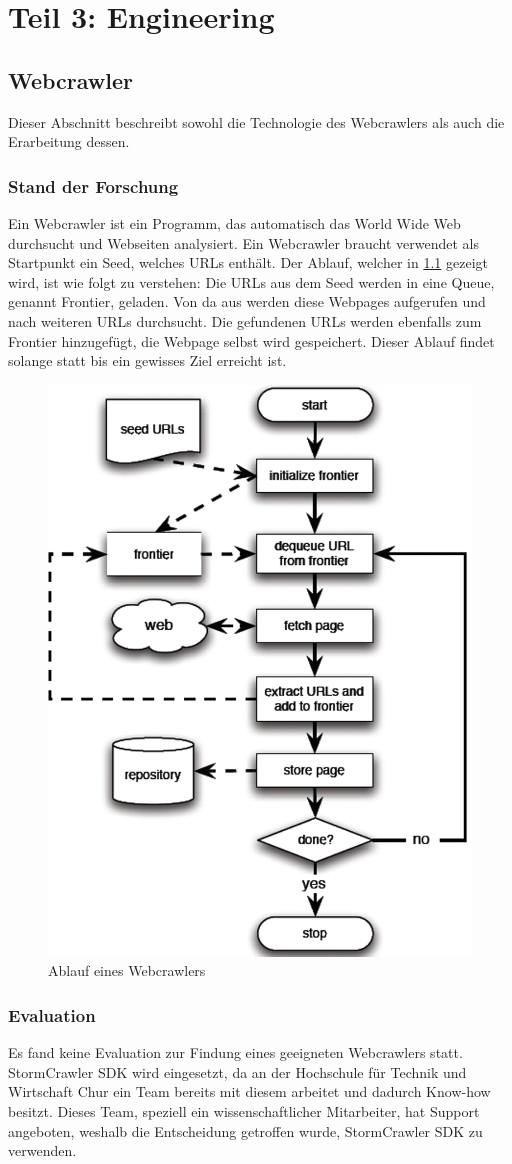 \chapter{Teil 3: Engineering}
\label{chap:engineering}
\section{Webcrawler}
Dieser Abschnitt beschreibt sowohl die Technologie des Webcrawlers als auch die Erarbeitung dessen.
\subsection{Stand der Forschung}
Ein Webcrawler ist ein Programm, das automatisch das World Wide Web durchsucht und Webseiten analysiert\cite[p.311]{liu2007web}.
Ein Webcrawler braucht verwendet als Startpunkt ein Seed, welches URLs enthält.
Der Ablauf, welcher in \cref{fig:flowchart_webcrawler} gezeigt wird, ist wie folgt zu verstehen:
Die URLs aus dem Seed werden in eine Queue, genannt Frontier, geladen.
Von da aus werden diese Webpages aufgerufen und nach weiteren URLs durchsucht.
Die gefundenen URLs werden ebenfalls zum Frontier hinzugefügt, die Webpage selbst wird gespeichert.
Dieser Ablauf findet solange statt bis ein gewisses Ziel erreicht ist\cite[p.313]{liu2007web}.
\begin{figure}
	\includegraphics[width=0.5\columnwidth,keepaspectratio]{img/flowchart_webcrawler.png}
	\caption{Ablauf eines Webcrawlers}
	\label{fig:flowchart_webcrawler}
\end{figure}
\subsection{Evaluation}
Es fand keine Evaluation zur Findung eines geeigneten Webcrawlers statt.
StormCrawler SDK wird eingesetzt, da an der Hochschule für Technik und Wirtschaft Chur ein Team bereits mit diesem arbeitet und dadurch Know-how besitzt.
Dieses Team, speziell ein wissenschaftlicher Mitarbeiter, hat Support angeboten, weshalb die Entscheidung getroffen wurde, StormCrawler SDK zu verwenden.
